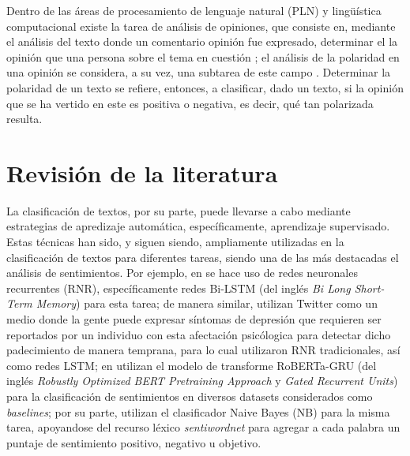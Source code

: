 \documentclass[a4paper]{llncs}
\begin{document}
Dentro de las áreas de procesamiento de lenguaje natural (PLN) y lingüística
computacional existe la tarea de análisis de opiniones, que consiste en,
mediante el análisis del texto donde un comentario opinión fue expresado,
determinar el la opinión que una persona sobre el tema en cuestión
\cite{mejova2009sentiment}; el análisis de la polaridad en una opinión se
considera, a su vez, una subtarea de este campo \cite{gambino-2019}. Determinar
la polaridad de un texto se refiere, entonces, a clasificar, dado un texto, si
la opinión que se ha vertido en este es positiva o negativa, es decir, qué tan
polarizada resulta.

\section{Revisión de la literatura}
\label{sec:org264c126}
La clasificación de textos, por su parte, puede llevarse a cabo mediante
estrategias de apredizaje automática, específicamente, aprendizaje supervisado.
Estas técnicas han sido, y siguen siendo, ampliamente utilizadas en la
clasificación de textos para diferentes tareas, siendo una de las más destacadas
el análisis de sentimientos. Por ejemplo, en \cite{jaca2023sentiment} se hace uso
de redes neuronales recurrentes (RNR), específicamente redes Bi-LSTM (del inglés
\emph{Bi Long Short-Term Memory}) para esta tarea;  de manera similar,
\cite{depression_detection} utilizan Twitter como un medio donde la gente puede
expresar síntomas de depresión que requieren ser reportados por un individuo con
esta afectación psicólogica para detectar dicho padecimiento de manera temprana,
para lo cual utilizaron RNR tradicionales, así como redes LSTM; en
\cite{roberta_gru} utilizan el modelo de transforme RoBERTa-GRU (del inglés
\emph{Robustly Optimized BERT Pretraining Approach} y \emph{Gated Recurrent Units}) para
la clasificación de sentimientos en diversos datasets considerados como
\emph{baselines}; por su parte, \cite{sentiment_naive_bayes} utilizan el clasificador
Naive Bayes (NB) para la misma tarea, apoyandose del recurso léxico \emph{sentiwordnet}
para agregar a cada palabra un puntaje de sentimiento positivo, negativo u
objetivo.
\end{document}
